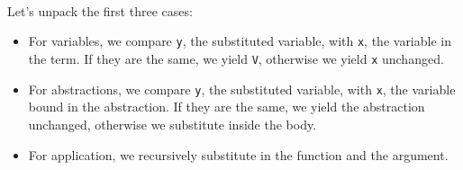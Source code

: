 \begin{fence}
\begin{code}
\AgdaSpace{}%
\AgdaOperator{\AgdaFunction{]}}\AgdaSpace{}%
\AgdaOperator{\AgdaInductiveConstructor{]}}\<%
\\
\>[0]\AgdaSymbol{(}\AgdaSpace{}%
\AgdaSpace{}%
\AgdaSpace{}%
\AgdaSymbol{)}\AgdaSpace{}%
\AgdaOperator{\AgdaFunction{[}}\AgdaSpace{}%
\AgdaSpace{}%
\AgdaOperator{\AgdaFunction{:=}}\AgdaSpace{}%
\AgdaSpace{}%
\AgdaOperator{\AgdaFunction{]}}\AgdaSpace{}%
\AgdaSpace{}%
\AgdaSpace{}%
\AgdaSpace{}%
\<%
\\
\>[0]\AgdaSpace{}%
\AgdaSymbol{|}\AgdaSpace{}%
\AgdaSpace{}%
\AgdaSymbol{\AgdaUnderscore{}}%
\>[21]\AgdaSymbol{=}%
\>[24]\AgdaSpace{}%
\AgdaSpace{}%
\AgdaSpace{}%
\<%
\\
\>[0]\AgdaSpace{}%
\AgdaSymbol{|}\AgdaSpace{}%
%
\>[10]\AgdaSymbol{\AgdaUnderscore{}}%
\>[21]\AgdaSymbol{=}%
\>[24]\AgdaSpace{}%
\AgdaSpace{}%
\AgdaSpace{}%
\AgdaSpace{}%
\AgdaOperator{\AgdaFunction{[}}\AgdaSpace{}%
\AgdaSpace{}%
\AgdaOperator{\AgdaFunction{:=}}\AgdaSpace{}%
\AgdaSpace{}%
\AgdaOperator{\AgdaFunction{]}}\<%
\end{code}
\end{fence}

Let's unpack the first three cases:

\begin{itemize}
\item
  For variables, we compare \texttt{y}, the substituted variable, with
  \texttt{x}, the variable in the term. If they are the same, we yield
  \texttt{V}, otherwise we yield \texttt{x} unchanged.
\item
  For abstractions, we compare \texttt{y}, the substituted variable,
  with \texttt{x}, the variable bound in the abstraction. If they are
  the same, we yield the abstraction unchanged, otherwise we substitute
  inside the body.
\item
  For application, we recursively substitute in the function and the
  argument.
\end{itemize}

